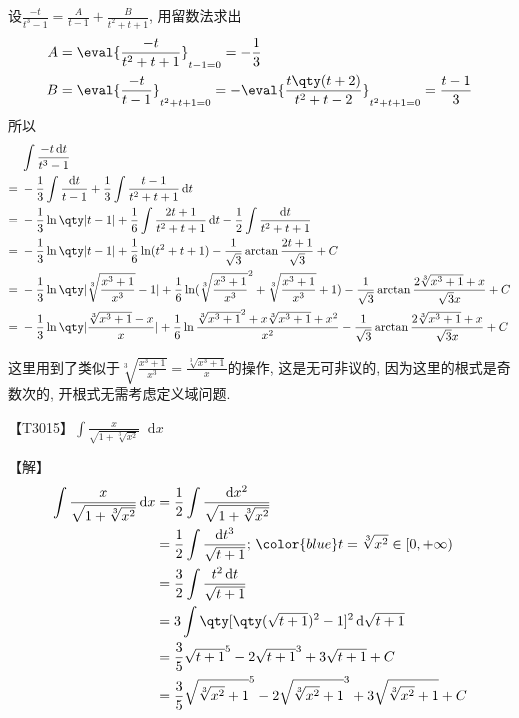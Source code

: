 \documentclass{ctexbook}
\newcommand*{\dif}{\mathop{}\!\mathrm{d}}
\begin{document}
{设$\frac{-t}{t^{3}-1}=\frac{A}{t-1}+\frac{B}{t^{2}+t+1}$, 用留数法求出
\begin{align*}
A={}&\eval{\frac{-t}{t^{2}+t+1}}_{t-1=0}=-\frac{1}{3}\\
B={}&\eval{\frac{-t}{t-1}}_{t^{2}+t+1=0}=-\eval{\frac{t\qty(t+2)}{t^{2}+t-2}}_{t^{2}+t+1=0}=\frac{t-1}{3}
\end{align*}
所以
\begin{align*}
{}&\int\frac{-t\dif{t}}{t^{3}-1}\\
={}&-\frac{1}{3}\int\frac{\dif{t}}{t-1}+\frac{1}{3}\int\frac{t-1}{t^{2}+t+1}\dif{t}\\
={}&-\frac{1}{3}\ln\qty|t-1|+\frac{1}{6}\int\frac{2t+1}{t^{2}+t+1}\dif{t}-\frac{1}{2}\int\frac{\dif{t}}{t^{2}+t+1}\\
={}&-\frac{1}{3}\ln\qty|t-1|+\frac{1}{6}\ln(t^{2}+t+1)-\frac{1}{\sqrt{3}}\arctan{\frac{2t+1}{\sqrt{3}}}+C\\
={}&-\frac{1}{3}\ln\qty|\sqrt[3]{\frac{x^{3}+1}{x^{3}}}-1|+\frac{1}{6}\ln(\sqrt[3]{\frac{x^{3}+1}{x^{3}}}^{2}+\sqrt[3]{\frac{x^{3}+1}{x^{3}}}+1)-\frac{1}{\sqrt{3}}\arctan{\frac{2\sqrt[3]{x^{3}+1}+x}{\sqrt{3}x}}+C\\
={}&-\frac{1}{3}\ln\qty|\frac{\sqrt[3]{x^{3}+1}-x}{x}|+\frac{1}{6}\ln{\frac{\sqrt[3]{x^{3}+1}^{2}+x\sqrt[3]{x^{3}+1}+x^{2}}{x^{2}}}-\frac{1}{\sqrt{3}}\arctan{\frac{2\sqrt[3]{x^{3}+1}+x}{\sqrt{3}x}}+C
\end{align*}\par
{\kaishu 这里用到了类似于$\sqrt[3]{\frac{x^{3}+1}{x^{3}}}=\frac{\sqrt[3]{x^{3}+1}}{x}$的操作, 这是无可非议的, 因为这里的根式是奇数次的, 开根式无需考虑定义域问题. \par}
【T3015】$\int\frac{x}{\sqrt{1+\sqrt[3]{x^{2}}}}\dif{x}$\par
【解】
\begin{align*}
\int\frac{x}{\sqrt{1+\sqrt[3]{x^{2}}}}\dif{x}={}&\frac{1}{2}\int\frac{\dif{x^{2}}}{\sqrt{1+\sqrt[3]{x^{2}}}}\\
={}&\frac{1}{2}\int\frac{\dif{t^{3}}}{\sqrt{t+1}};\,{\color{blue}t=\sqrt[3]{x^{2}}\in\left[0,+\infty\right)}\\
={}&\frac{3}{2}\int\frac{t^{2}\dif{t}}{\sqrt{t+1}}\\
={}&3\int\qty[\qty(\sqrt{t+1})^{2}-1]^{2}\dif{\sqrt{t+1}}\\
={}&\frac{3}{5}\sqrt{t+1}^{5}-2\sqrt{t+1}^{3}+3\sqrt{t+1}+C\\
={}&\frac{3}{5}\sqrt{\sqrt[3]{x^{2}}+1}^{5}-2\sqrt{\sqrt[3]{x^{2}}+1}^{3}+3\sqrt{\sqrt[3]{x^{2}}+1}+C
\end{align*}\par
}
\end{document}
